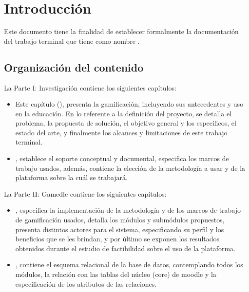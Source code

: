 \chapter{Introducción}
\label{ch:introduccion}

 Este documento tiene la finalidad de establecer formalmente la documentación del
 trabajo terminal {\numeroTT} que tiene como nombre {\bf\tituloTT}.

\section{Organización del contenido}

 \noindent La {\pf Parte I: Investigación} contiene los siguientes capítulos:%

    \begin{itemize}
        \item Este capítulo (), presenta la
        gamificación, incluyendo sus antecedentes y uso en la educación. En lo referente
        a la definición del proyecto, se detalla el problema, la propuesta de solución,
        el objetivo general y los específicos, el estado del arte, y finalmente los
        alcances y limitaciones de este trabajo terminal.

        \item {}, establece el soporte conceptual y documental,
        especifica los marcos de trabajo usados, además, contiene la elección de la
        metodología a usar y de la plataforma sobre la cuál se trabajará.

    \end{itemize}

\noindent La {\pf Parte II: Gamedle} contiene los siguientes capítulos:%

\begin{itemize}

    \item {}, especifica la implementación de la metodología y de los marcos de
    trabajo de gamificación usados, detalla los módulos y submódulos propuestos, presenta distintos
    actores para el sistema, especificando su perfil y los beneficios que se les brindan, y por
    último se exponen los resultados obtenidos durante el estudio de factibilidad sobre el uso
    de la plataforma.


    \item {}, contiene el esquema relacional de la base de
    datos, contemplando todos los módulos, la relación con las tablas del núcleo (core)
    de moodle y la especificación de los atributos de las relaciones.

\end{itemize}

